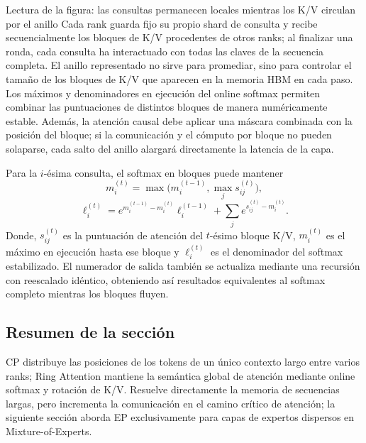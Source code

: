 
\begin{knowledgebox}{Lectura de la figura: las consultas permanecen locales mientras los K/V circulan por el anillo}
Cada rank guarda fijo su propio shard de consulta y recibe secuencialmente los bloques de K/V procedentes de otros ranks; al finalizar una ronda, cada consulta ha interactuado con todas las claves de la secuencia completa. El anillo representado no sirve para promediar, sino para controlar el tamaño de los bloques de K/V que aparecen en la memoria HBM en cada paso. Los máximos y denominadores en ejecución del online softmax permiten combinar las puntuaciones de distintos bloques de manera numéricamente estable. Además, la atención causal debe aplicar una máscara combinada con la posición del bloque; si la comunicación y el cómputo por bloque no pueden solaparse, cada salto del anillo alargará directamente la latencia de la capa.
\end{knowledgebox}

Para la $i$-ésima consulta, el softmax en bloques puede mantener
\[
m_i^{(t)}=\max\bigl(m_i^{(t-1)},\max_j s_{ij}^{(t)}\bigr),
\]
\[
\ell_i^{(t)}=e^{m_i^{(t-1)}-m_i^{(t)}}\ell_i^{(t-1)}
+\sum_j e^{s_{ij}^{(t)}-m_i^{(t)}}.
\]
Donde, $s_{ij}^{(t)}$ es la puntuación de atención del $t$-ésimo bloque K/V, $m_i^{(t)}$ es el máximo en ejecución hasta ese bloque y $\ell_i^{(t)}$ es el denominador del softmax estabilizado. El numerador de salida también se actualiza mediante una recursión con reescalado idéntico, obteniendo así resultados equivalentes al softmax completo mientras los bloques fluyen.



\subsection{Resumen de la sección}

CP distribuye las posiciones de los tokens de un único contexto largo entre varios ranks; Ring Attention mantiene la semántica global de atención mediante online softmax y rotación de K/V. Resuelve directamente la memoria de secuencias largas, pero incrementa la comunicación en el camino crítico de atención; la siguiente sección aborda EP exclusivamente para capas de expertos dispersos en Mixture-of-Experts.


